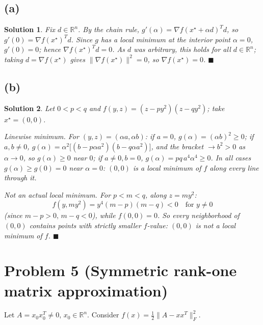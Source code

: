 \documentclass[11pt]{article}
\newcommand{\R}{\mathbb{R}}
\newtheorem*{solution}{Solution}
\begin{document}
\subsection*{(a)}
\begin{solution}
Fix $d\in\R^n$. By the chain rule, $g'(\alpha)=\nabla f(x^\star+\alpha d)^Td$, so $g'(0)=\nabla f(x^\star)^Td$. Since $g$ has a local minimum at the interior point $\alpha=0$, $g'(0)=0$; hence $\nabla f(x^\star)^Td=0$. As $d$ was arbitrary, this holds for all $d\in\R^n$; taking $d=\nabla f(x^\star)$ gives $\|\nabla f(x^\star)\|^2=0$, so $\nabla f(x^\star)=0$. $\blacksquare$
\end{solution}

\subsection*{(b)}
\begin{solution}
Let $0<p<q$ and $f(y,z)=(z-py^2)(z-qy^2)$; take $x^\star=(0,0)$.

\emph{Linewise minimum.} For $(y,z)=(\alpha a,\alpha b)$: if $a=0$, $g(\alpha)=(\alpha b)^2\ge0$; if $a,b\ne0$, $g(\alpha)=\alpha^2\big[(b-p\alpha a^2)(b-q\alpha a^2)\big]$, and the bracket $\to b^2>0$ as $\alpha\to0$, so $g(\alpha)\ge0$ near $0$; if $a\ne0,b=0$, $g(\alpha)=pq\,a^4\alpha^4\ge0$. In all cases $g(\alpha)\ge g(0)=0$ near $\alpha=0$: $(0,0)$ is a local minimum of $f$ along every line through it.

\emph{Not an actual local minimum.} For $p<m<q$, along $z=my^2$:
\[
f(y,my^2) = y^4(m-p)(m-q) < 0 \quad\text{for } y\ne0
\]
(since $m-p>0,\,m-q<0$), while $f(0,0)=0$. So every neighborhood of $(0,0)$ contains points with strictly smaller $f$-value: $(0,0)$ is not a local minimum of $f$. $\blacksquare$
\end{solution}

\section*{Problem 5 (Symmetric rank-one matrix approximation)}

Let $A=x_0x_0^T\ne0$, $x_0\in\R^n$. Consider $f(x)=\tfrac12\|A-xx^T\|_F^2$.
\end{document}
